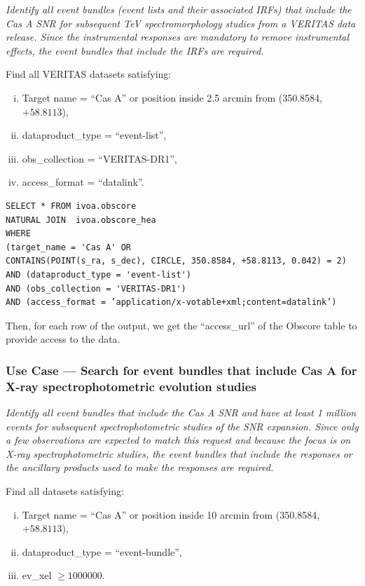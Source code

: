 {\em Identify all event bundles (event lists and their associated \glspl{IRF}) that include the Cas A SNR for subsequent TeV spectromorphology studies from a VERITAS data release. Since the instrumental responses are mandatory to remove instrumental effects, the event bundles that include the  \glspl{IRF} are required.\/}

\medskip
\noindent Find all VERITAS datasets satisfying:
\begin{enumerate}[(i)]
  \item Target name = ``Cas A'' or position inside 2.5 arcmin from (350.8584, $+58.8113$),
  \item dataproduct\_type = ``event-list'',
  \item obs\_collection = ``VERITAS-DR1'',
  \item access\_format = ``datalink''.
\end{enumerate}

\begin{verbatim}
SELECT * FROM ivoa.obscore
NATURAL JOIN  ivoa.obscore_hea
WHERE
(target_name = 'Cas A' OR
CONTAINS(POINT(s_ra, s_dec), CIRCLE, 350.8584, +58.8113, 0.042) = 2)
AND (dataproduct_type = 'event-list')
AND (obs_collection = 'VERITAS-DR1')
AND (access_format = ’application/x-votable+xml;content=datalink’)
\end{verbatim}

Then, for each row of the output, we get the ``access\_url'' of the Obscore table to provide access to the data.


\subsubsection{Use Case --- Search for event bundles that include Cas A for X-ray spectrophotometric evolution studies}

{\em Identify all event bundles that include the Cas A SNR and have at least 1 million events for subsequent spectrophotometric studies of the SNR expansion. Since only a few observations are expected to match this request and because the focus is on X-ray spectrophotometric studies, the event bundles that include the responses or the ancillary products used to make the responses are required.\/}

\medskip
\noindent Find all datasets satisfying:
\begin{enumerate}[(i)]
  \item Target name = ``Cas A'' or position inside 10 arcmin from (350.8584, $+58.8113$),
  \item dataproduct\_type = ``event-bundle'',
  \item ev\_xel $\geq 1000000$.
\end{enumerate}

